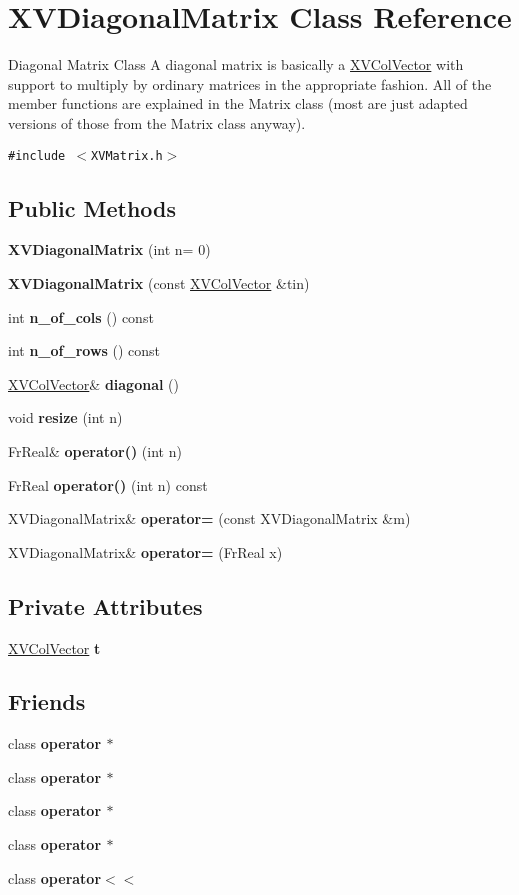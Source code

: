 \hypertarget{class_XVDiagonalMatrix}{
\section{XVDiagonal\-Matrix  Class Reference}
\label{XVDiagonalMatrix}
}
Diagonal Matrix Class A diagonal matrix is basically a \hyperlink{class_XVColVector}{XVCol\-Vector} with support to multiply by ordinary matrices in the appropriate fashion. All of the member functions are explained in the Matrix class (most are just adapted versions of those from the Matrix class anyway). 


{\tt \#include $<$XVMatrix.h$>$}

\subsection*{Public Methods}
\begin{CompactItemize}
\item 
{\bf XVDiagonal\-Matrix} (int n= 0)
\item 
{\bf XVDiagonal\-Matrix} (const \hyperlink{class_XVColVector}{XVCol\-Vector} \&tin)
\item 
int {\bf n\_\-of\_\-cols} () const
\item 
int {\bf n\_\-of\_\-rows} () const
\item 
\hyperlink{class_XVColVector}{XVCol\-Vector}\& {\bf diagonal} ()
\item 
void {\bf resize} (int n)
\item 
Fr\-Real\& {\bf operator()} (int n)
\item 
Fr\-Real {\bf operator()} (int n) const
\item 
XVDiagonal\-Matrix\& {\bf operator=} (const XVDiagonal\-Matrix \&m)
\item 
XVDiagonal\-Matrix\& {\bf operator=} (Fr\-Real x)
\end{CompactItemize}
\subsection*{Private Attributes}
\begin{CompactItemize}
\item 
\hyperlink{class_XVColVector}{XVCol\-Vector} {\bf t}
\end{CompactItemize}
\subsection*{Friends}
\begin{CompactItemize}
\item 
class {\bf operator $\ast$}
\item 
class {\bf operator $\ast$}
\item 
class {\bf operator $\ast$}
\item 
class {\bf operator $\ast$}
\item 
class {\bf operator$<$$<$}
\end{CompactItemize}


